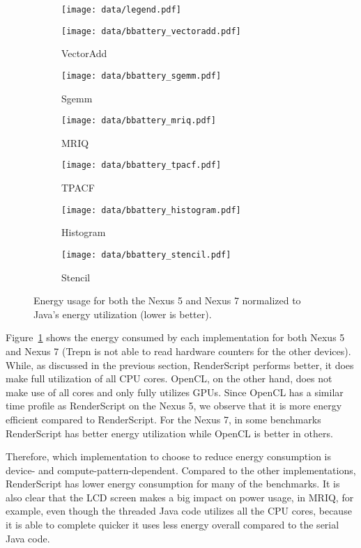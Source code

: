 \begin{figure}
  \centering

  \begin{subfigure}[b]{0.5\textwidth}
          \centering
          \texttt{[image: data/legend.pdf]}
  \end{subfigure}

  \begin{subfigure}[b]{0.23\textwidth}
      \centering
      \texttt{[image: data/bbattery\_vectoradd.pdf]}
      \caption{VectorAdd}
  \end{subfigure}%
  \begin{subfigure}[b]{0.23\textwidth}
      \centering
      \texttt{[image: data/bbattery\_sgemm.pdf]}
      \caption{Sgemm}
  \end{subfigure}


  \begin{subfigure}[b]{0.23\textwidth}
      \centering
      \texttt{[image: data/bbattery\_mriq.pdf]}
      \caption{MRIQ}
  \end{subfigure}
  \begin{subfigure}[b]{0.23\textwidth}
      \centering
      \texttt{[image: data/bbattery\_tpacf.pdf]}
      \caption{TPACF}
  \end{subfigure}%

  \begin{subfigure}[b]{0.23\textwidth}
      \centering
      \texttt{[image: data/bbattery\_histogram.pdf]}
      \caption{Histogram}
  \end{subfigure}%
  \begin{subfigure}[b]{0.23\textwidth}
      \centering
      \texttt{[image: data/bbattery\_stencil.pdf]}
      \caption{Stencil} 
  \end{subfigure}
  \caption{Energy usage for both the Nexus 5 and Nexus 7 normalized to Java's energy utilization (lower is better).}
  \label{fig:power}
\end{figure}

Figure~\ref{fig:power} shows the energy consumed by each implementation for both Nexus 5 and Nexus 7 
  (Trepn is not able to read hardware counters for the other devices).
While, as discussed in the previous section, RenderScript performs better, it does make full utilization of all CPU
  cores.
OpenCL, on the other hand, does not make use of all cores and only fully utilizes GPUs.
Since OpenCL has a similar time profile as RenderScript on the Nexus 5, we observe that it is more energy efficient
  compared to RenderScript.
For the Nexus 7, in some benchmarks RenderScript has better energy utilization while OpenCL is better in others.

Therefore, which implementation to choose to reduce energy consumption is
device- and compute-pattern-dependent.
Compared to the other implementations, RenderScript has lower energy
consumption for many of the benchmarks.
It is also clear that the LCD screen makes a big impact on power usage, in
MRIQ, for example, even though the threaded Java code
  utilizes all the CPU cores, because it is able to complete quicker it uses
less energy overall compared to the serial Java code.

